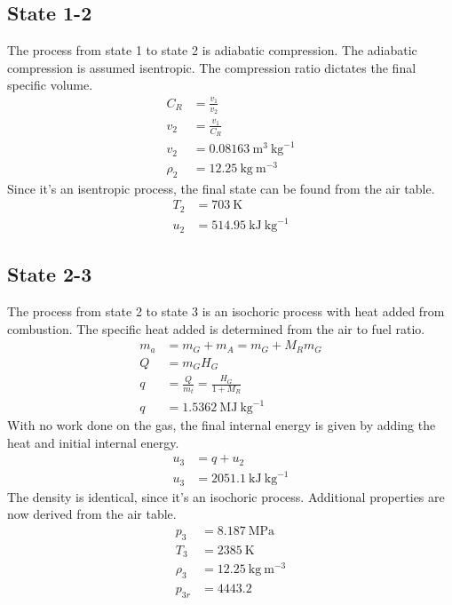 \documentclass[10pt,a4paper]{article}
\begin{document}
	\subsection*{State 1-2}
	The process from state 1 to state 2 is adiabatic compression. The adiabatic compression is assumed isentropic. The compression ratio dictates the final specific volume.
	\begin{align*}
		C_R &= \frac{v_1}{v_2}\\
		v_2 &= \frac{v_1}{C_R}\\
		v_2 &= 0.08163\ \text{m}^3\ \text{kg}^{-1}\\
		\rho_2 &= 12.25\ \text{kg}\ \text{m}^{-3}
	\end{align*}
	Since it's an isentropic process, the final state can be found from the air table.
	\begin{align*}
		T_2 &= 703\ \text{K}\\
		u_2 &= 514.95\ \text{kJ}\ \text{kg}^{-1}
	\end{align*}
	\subsection*{State 2-3}
	The process from state 2 to state 3 is an isochoric process with heat added from combustion. The specific heat added is determined from the air to fuel ratio.
	\begin{align*}
		m_a &= m_G + m_A = m_G + M_R m_G \\
		Q &= m_G H_G \\
		q &= \frac{Q}{m_t} = \frac{H_G}{1 + M_R}\\
		q &= 1.5362\ \text{MJ}\ \text{kg}^{-1}
	\end{align*}
	With no work done on the gas, the final internal energy is given by adding the heat and initial internal energy.
	\begin{align*}
		u_3 &= q + u_2\\
		u_3 &= 2051.1\ \text{kJ}\ \text{kg}^{-1}
	\end{align*}
	The density is identical, since it's an isochoric process. Additional properties are now derived from the air table.
	\begin{align*}
		p_3 &= 8.187\ \text{MPa}\\
		T_3 &= 2385\ \text{K}\\
		\rho_3 &= 12.25\ \text{kg}\ \text{m}^{-3}\\
		p_{3r} &= 4443.2
	\end{align*}
\end{document}
